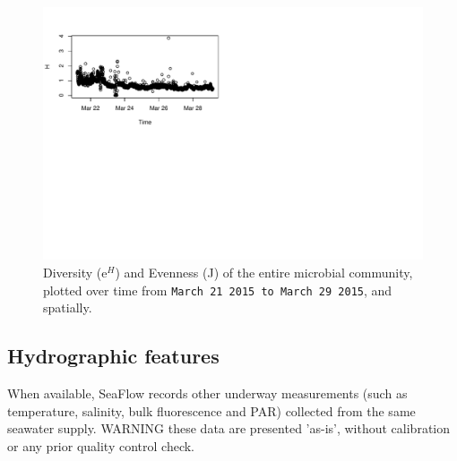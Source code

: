 \documentclass[a4paper]{article}
\begin{document}
\begin{figure}[H]
\centering
\includegraphics{CruiseReport-005}
\caption{Diversity (e$^{H}$) and Evenness (J) of the entire microbial community, plotted over time from \texttt{{March 21 2015} to \texttt{March 29 2015}}, and spatially.}%
\end{figure}


\newpage
\subsection{Hydrographic features}
When available, SeaFlow records other underway measurements (such as temperature, salinity, bulk fluorescence and PAR) collected from the same seawater supply. WARNING these data are presented 'as-is', without calibration or any prior quality control check.
\end{document}
